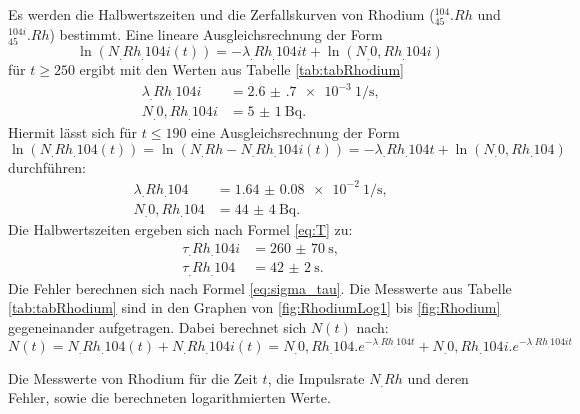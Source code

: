 Es werden die Halbwertszeiten und die Zerfallskurven von Rhodium ($^{104}_{45}.{Rh}$ und $^{104i}_{45}.{Rh}$) bestimmt.
Eine lineare Ausgleichsrechnung der Form 
\begin{equation}
\ln(N_.{Rh_.{104i}}(t))=-\lambda_.{Rh_.{104i}} t+\ln(N_.{0,Rh_.{104i}})\label{eq:Ausgleich2}
\end{equation}
für $t\geq 250$ ergibt mit den Werten aus Tabelle \ref{tab:tabRhodium}
\begin{align*}
\lambda_.{Rh_.{104i}} 	&= \SI{2.6(7)e-3}{1\per\second}\text{,}\\
N_.{0,Rh_.{104i}} 		&= \SI{5(1)}{\becquerel}\text{.}
\end{align*}
Hiermit lässt sich für $t\leq 190$ eine Ausgleichsrechnung der Form 
\begin{equation}
\ln(N_.{Rh_.{104}}(t))=\ln(N_.{Rh}-N_.{Rh_.{104i}}(t))=-\lambda_.{Rh_.{104}} t+\ln(N_.{0,Rh_.{104}})\label{eq:Ausgleich1}
\end{equation}
durchführen:
\begin{align*}
\lambda_.{Rh_.{104}} 	&= \SI{1.64(8)e-2}{1\per\second}\text{,}\\
N_.{0,Rh_.{104}} 		&= \SI{44(4)}{\becquerel}\text{.}
\end{align*}
Die Halbwertszeiten ergeben sich nach Formel \eqref{eq:T} zu:
\begin{align*}
\tau_.{Rh_.{104i}} 	&= \SI{260(70)}{\second}\text{,}\\
\tau_.{Rh_.{104}} &= \SI{42(2)}{\second}\text{.}
\end{align*}
Die Fehler berechnen sich nach Formel \eqref{eq:sigma_tau}. Die Messwerte aus Tabelle \ref{tab:tabRhodium} sind in den Graphen von \ref{fig:RhodiumLog1} bis \ref{fig:Rhodium} gegeneinander aufgetragen. Dabei berechnet sich $N(t)$ nach:
\begin{equation*}
N(t)=N_.{Rh_.{104}}(t)+N_.{Rh_.{104i}}(t)=N_.{0,Rh_.{104}}.e^{-\lambda_.{Rh_.{104}} t}+N_.{0,Rh_.{104i}}.e^{-\lambda_.{Rh_.{104i}} t}
\end{equation*}

\begin{table}
	\centering
	\caption{Die Messwerte von Rhodium für die Zeit $t$, die Impulsrate $N_.{Rh}$ und deren Fehler, sowie die berechneten logarithmierten Werte.}
	
	\label{tab:tabRhodium}
\end{table}

\begin{table}
	\centering
	
\end{table}

